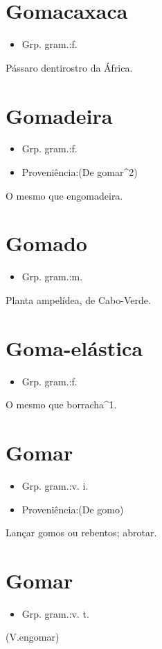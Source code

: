 \section{Gomacaxaca}
\begin{itemize}
\item {Grp. gram.:f.}
\end{itemize}
Pássaro dentirostro da África.
\section{Gomadeira}
\begin{itemize}
\item {Grp. gram.:f.}
\end{itemize}
\begin{itemize}
\item {Proveniência:(De \textunderscore gomar\textunderscore ^2)}
\end{itemize}
O mesmo que \textunderscore engomadeira\textunderscore .
\section{Gomado}
\begin{itemize}
\item {Grp. gram.:m.}
\end{itemize}
Planta ampelídea, de Cabo-Verde.
\section{Goma-elástica}
\begin{itemize}
\item {Grp. gram.:f.}
\end{itemize}
O mesmo que \textunderscore borracha\textunderscore ^1.
\section{Gomar}
\begin{itemize}
\item {Grp. gram.:v. i.}
\end{itemize}
\begin{itemize}
\item {Proveniência:(De \textunderscore gomo\textunderscore )}
\end{itemize}
Lançar gomos ou rebentos; abrotar.
\section{Gomar}
\begin{itemize}
\item {Grp. gram.:v. t.}
\end{itemize}
(V.engomar)
